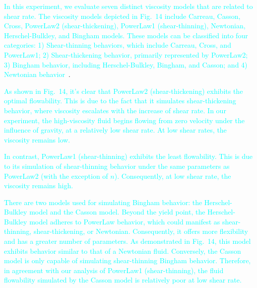 \documentclass[12pt,a4paper]{article}
\newcommand{\revised}[1]{\textcolor{cyan}{#1}}
\begin{document}
\revised{In this experiment, we evaluate seven distinct viscosity models that are related to shear rate. The viscosity models depicted in Fig.~14 include Carreau, Casson, Cross, PowerLaw2 (shear-thickening), PowerLaw1 (shear-thinning), Newtonian, Herschel-Bulkley, and Bingham models. These models can be classified into four categories: 1) Shear-thinning behaviors, which include Carreau, Cross, and PowerLaw1; 2) Shear-thickening behavior, primarily represented by PowerLaw2; 3) Bingham behavior, including Herschel-Bulkley, Bingham, and Casson; and 4) Newtonian behavior~\cite{Chhabra2010,Phan2017}}.


\revised{As shown in Fig.~14, it's clear that PowerLaw2 (shear-thickening) exhibits the optimal flowability. This is due to the fact that it simulates shear-thickening behavior, where viscosity escalates with the increase of shear rate. In our experiment, the high-viscosity fluid begins flowing from zero velocity under the influence of gravity, at a relatively low shear rate. At low shear rates, the viscosity remains low. }

\revised{In contrast, PowerLaw1 (shear-thinning) exhibits the least flowability. This is due to its simulation of shear-thinning behavior under the same parameters as PowerLaw2 (with the exception of $n$). Consequently, at low shear rate, the viscosity remains high.}

\revised{There are two models used for simulating Bingham behavior: the Herschel-Bulkley model and the Casson model. Beyond the yield point, the Herschel-Bulkley model adheres to PowerLaw behavior, which could manifest as shear-thinning, shear-thickening, or Newtonian. Consequently, it offers more flexibility and has a greater number of parameters. As demonstrated in Fig.~14, this model exhibits behavior similar to that of a Newtonian fluid. Conversely, the Casson model is only capable of simulating shear-thinning Bingham behavior. Therefore, in agreement with our analysis of PowerLaw1 (shear-thinning), the fluid flowability simulated by the Casson model is relatively poor at low shear rate.}
\end{document}
